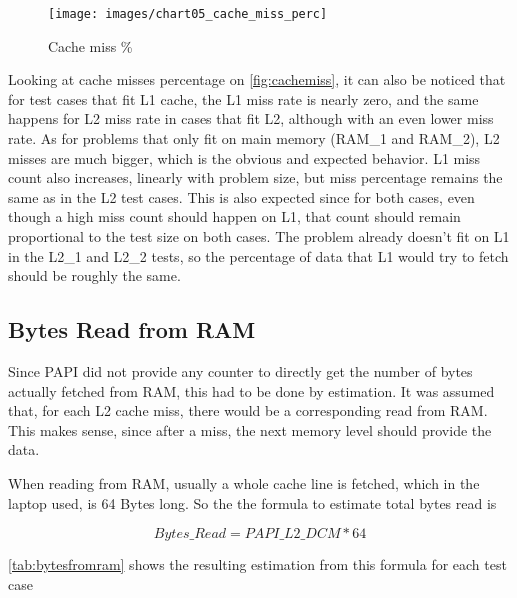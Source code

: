 \documentclass[twocolumn,10pt]{scrartcl}
\begin{document}
\begin{figure}[!htp]
	\begin{center}
		\texttt{[image: images/chart05\_cache\_miss\_perc]}
		\caption{Cache miss \% \label{fig:cachemiss}}
	\end{center}
\end{figure}

Looking at cache misses percentage on \autoref{fig:cachemiss}, it can also be noticed that for test cases that fit L1 cache, the L1 miss rate is nearly zero, and the same happens for L2 miss rate in cases that fit L2, although with an even lower miss rate.
As for problems that only fit on main memory (RAM\_1 and RAM\_2), L2 misses are much bigger, which is the obvious and expected behavior. L1 miss count also increases, linearly with problem size, but miss percentage remains the same as in the L2 test cases. This is also expected since for both cases, even though a high miss count should happen on L1, that count should remain proportional to the test size on both cases. The problem already doesn't fit on L1 in the L2\_1 and L2\_2 tests, so the percentage of data that L1 would try to fetch should be roughly the same.

\subsection{Bytes Read from RAM}

Since PAPI did not provide any counter to directly get the number of bytes actually fetched from RAM, this had to be done by estimation. It was assumed that, for each L2 cache miss, there would be a corresponding read from RAM. This makes sense, since after a miss, the next memory level should provide the data.

When reading from RAM, usually a whole cache line is fetched, which in the laptop used, is 64 Bytes long. So the the formula to estimate total bytes read is

$$Bytes\_Read = PAPI\_L2\_DCM * 64$$

\autoref{tab:bytesfromram} shows the resulting estimation from this formula for each test case
\end{document}
